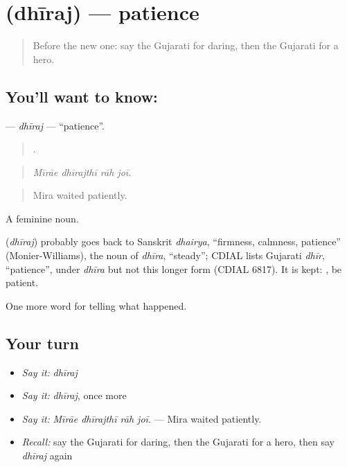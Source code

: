 \section[\texorpdfstring{\gu{ધીરજ} (dhīraj)}{ધીરજ (dhīraj)}]{ (dhīraj) — patience}

\label{lesson:GU-C308-dhiraj}



\begin{quote}
Before the new one: say the Gujarati for daring, then the Gujarati for a hero.
\end{quote}

\subsection*{You'll want to know: }
\textbf{} — \emph{dhīraj} — \textquotedblleft{}patience\textquotedblright{}.

\begin{quote}
   .
\end{quote}

\begin{quote}
\emph{Mīrāe dhīrajthī rāh joī.}
\end{quote}

\begin{quote}
Mira waited patiently.
\end{quote}

A feminine noun.

\begin{cousinweb}
\textbf{} (\emph{dhīraj}) probably goes back to Sanskrit \emph{dhairya}, \textquotedblleft{}firmness, calmness, patience\textquotedblright{} (Monier-Williams), the noun of \emph{dhīra}, \textquotedblleft{}steady\textquotedblright{}; CDIAL lists Gujarati \emph{dhīr}, \textquotedblleft{}patience\textquotedblright{}, under \emph{dhīra} but not this longer form (CDIAL 6817). It is kept: \textbf{ }, be patient.
\end{cousinweb}

\begin{grammarlens}[title={What you've built}]
One more word for telling what happened.
\end{grammarlens}

\subsection*{Your turn}
\begin{itemize}
\raggedright
  \item \emph{Say it:} \emph{dhīraj}
  \item \emph{Say it:} \emph{dhīraj}, once more
  \item \emph{Say it:} \emph{Mīrāe dhīrajthī rāh joī.} — Mira waited patiently.
  \item \emph{Recall:} say the Gujarati for daring, then the Gujarati for a hero, then say \emph{dhīraj} again
\end{itemize}

